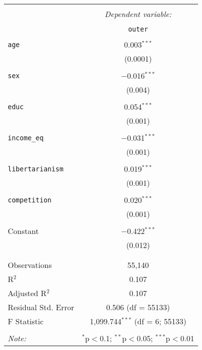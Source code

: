 \documentclass{article}
\begin{document}
	\begin{table}[!htbp] \centering 
		\caption{} 
		\label{} 
		\begin{tabular}{@{\extracolsep{5pt}}lc} 
			\\[-1.8ex]\hline 
			\hline \\[-1.8ex] 
			& \multicolumn{1}{c}{\textit{Dependent variable:}} \\ 
			\cline{2-2} 
			\\[-1.8ex] & \texttt{outer} \\ 
			\hline \\[-1.8ex] 
			\texttt{age} & 0.003$^{***}$ \\ 
			& (0.0001) \\ 
			& \\ 
			\texttt{sex} & $-$0.016$^{***}$ \\ 
			& (0.004) \\ 
			& \\ 
			\texttt{educ} & 0.054$^{***}$ \\ 
			& (0.001) \\ 
			& \\ 
			\texttt{income\_eq} & $-$0.031$^{***}$ \\ 
			& (0.001) \\ 
			& \\ 
			\texttt{libertarianism} & 0.019$^{***}$ \\ 
			& (0.001) \\ 
			& \\ 
			\texttt{competition} & 0.020$^{***}$ \\ 
			& (0.001) \\ 
			& \\ 
			Constant & $-$0.422$^{***}$ \\ 
			& (0.012) \\ 
			& \\ 
			\hline \\[-1.8ex] 
			Observations & 55,140 \\ 
			R$^{2}$ & 0.107 \\ 
			Adjusted R$^{2}$ & 0.107 \\ 
			Residual Std. Error & 0.506 (df = 55133) \\ 
			F Statistic & 1,099.744$^{***}$ (df = 6; 55133) \\ 
			\hline 
			\hline \\[-1.8ex] 
			\textit{Note:}  & \multicolumn{1}{r}{$^{*}$p$<$0.1; $^{**}$p$<$0.05; $^{***}$p$<$0.01} \\ 
		\end{tabular} 
	\end{table} 
\end{document}
